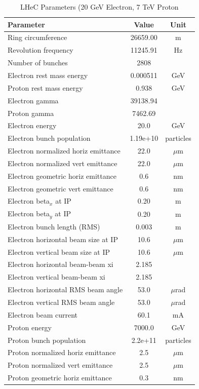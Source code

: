\documentclass{article}
\begin{document}
\begin{longtable}{lcc}
\caption{LHeC Parameters (20 GeV Electron, 7 TeV Proton} \\
\toprule
Parameter & Value & Unit \\
\midrule
Ring circumference & 26659.00 & m \\
Revolution frequency & 11245.91 & Hz \\
Number of bunches & 2808 &  \\
Electron rest mass energy & 0.000511 & GeV \\
Proton rest mass energy & 0.938 & GeV \\
Electron gamma & 39138.94 &  \\
Proton gamma & 7462.69 &  \\
Electron energy & 20.0 & GeV \\
Electron bunch population & 1.19e+10 & particles \\
Electron normalized horiz emittance & 22.0 & $\mu$m \\
Electron normalized vert emittance & 22.0 & $\mu$m \\
Electron geometric horiz emittance & 0.6 & nm \\
Electron geometric vert emittance & 0.6 & nm \\
Electron beta$_x$ at IP & 0.20 & m \\
Electron beta$_y$ at IP & 0.20 & m \\
Electron bunch length (RMS) & 0.003 & m \\
Electron horizontal beam size at IP & 10.6 & $\mu$m \\
Electron vertical beam size at IP & 10.6 & $\mu$m \\
Electron horizontal beam-beam xi & 2.185 &  \\
Electron vertical beam-beam xi & 2.185 &  \\
Electron horizontal RMS beam angle & 53.0 & $\mu$rad \\
Electron vertical RMS beam angle & 53.0 & $\mu$rad \\
Electron beam current & 60.1 & mA \\
Proton energy & 7000.0 & GeV \\
Proton bunch population & 2.2e+11 & particles \\
Proton normalized horiz emittance & 2.5 & $\mu$m \\
Proton normalized vert emittance & 2.5 & $\mu$m \\
Proton geometric horiz emittance & 0.3 & nm \\

\end{longtable}
\end{document}
